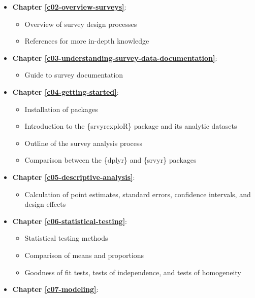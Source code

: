 \documentclass[
]{krantz}
\providecommand{\tightlist}{%
  \setlength{\itemsep}{0pt}\setlength{\parskip}{0pt}}
\begin{document}
\begin{itemize}
\tightlist
\item
  \textbf{Chapter \ref{c02-overview-surveys}}:

  \begin{itemize}
  \tightlist
  \item
    Overview of survey design processes
  \item
    References for more in-depth knowledge
  \end{itemize}
\item
  \textbf{Chapter \ref{c03-understanding-survey-data-documentation}}:

  \begin{itemize}
  \tightlist
  \item
    Guide to survey documentation
  \end{itemize}
\item
  \textbf{Chapter \ref{c04-getting-started}}:

  \begin{itemize}
  \tightlist
  \item
    Installation of packages
  \item
    Introduction to the \{srvyrexploR\} package and its analytic datasets
  \item
    Outline of the survey analysis process
  \item
    Comparison between the \{dplyr\} and \{srvyr\} packages
  \end{itemize}
\item
  \textbf{Chapter \ref{c05-descriptive-analysis}}:

  \begin{itemize}
  \tightlist
  \item
    Calculation of point estimates, standard errors, confidence intervals, and design effects
  \end{itemize}
\item
  \textbf{Chapter \ref{c06-statistical-testing}}:

  \begin{itemize}
  \tightlist
  \item
    Statistical testing methods
  \item
    Comparison of means and proportions
  \item
    Goodness of fit tests, tests of independence, and tests of homogeneity
  \end{itemize}
\item
  \textbf{Chapter \ref{c07-modeling}}:


\end{itemize}
\end{document}
